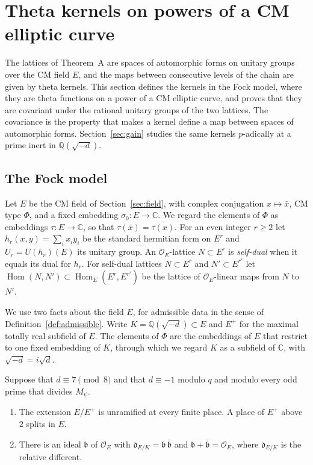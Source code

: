 \section{Theta kernels on powers of a CM elliptic curve}\label{sec:chain}

The lattices of Theorem~A are spaces of automorphic forms on unitary groups over the CM field $E$, and the maps between consecutive levels of the chain are given by theta kernels. This section defines the kernels in the Fock model, where they are theta functions on a power of a CM elliptic curve, and proves that they are covariant under the rational unitary groups of the two lattices. The covariance is the property that makes a kernel define a map between spaces of automorphic forms. Section~\ref{sec:gain} studies the same kernels $p$-adically at a prime inert in $\mathbb Q(\sqrt{-d})$.

\subsection{The Fock model}\label{sec:fock}

Let $E$ be the CM field of Section~\ref{sec:field}, with complex conjugation $x\mapsto\bar x$, CM type $\Phi$, and a fixed embedding $\sigma_0\colon E\to\mathbb C$. We regard the elements of $\Phi$ as embeddings $\tau\colon E\to\mathbb C$, so that $\tau(\bar x)=\overline{\tau(x)}$. For an even integer $r\ge2$ let $h_r(x,y)=\sum_ix_i\bar y_i$ be the standard hermitian form on $E^r$ and $U_r=U(h_r)(E)$ its unitary group. An $\mathcal O_E$-lattice $N\subset E^r$ is \emph{self-dual} when it equals its dual for $h_r$. For self-dual lattices $N\subset E^r$ and $N'\subset E^{r'}$ let $\operatorname{Hom}(N,N')\subset\operatorname{Hom}_E(E^r,E^{r'})$ be the lattice of $\mathcal O_E$-linear maps from $N$ to $N'$.

We use two facts about the field $E$, for admissible data in the sense of Definition~\ref{def:admissible}. Write $K=\mathbb Q(\sqrt{-d})\subset E$ and $E^+$ for the maximal totally real subfield of $E$. The elements of $\Phi$ are the embeddings of $E$ that restrict to one fixed embedding of $K$, through which we regard $K$ as a subfield of $\mathbb C$, with $\sqrt{-d}=i\sqrt d$.

\begin{lemma}\label{hostideal}
Suppose that $d\equiv7\pmod8$ and that $d\equiv-1$ modulo $q$ and modulo every odd prime that divides $M_\psi$.
\begin{enumerate}
\item[(i)] The extension $E/E^+$ is unramified at every finite place. A place of $E^+$ above $2$ splits in $E$.
\item[(ii)] There is an ideal $\mathfrak b$ of $\mathcal O_E$ with $\mathfrak d_{E/K}=\mathfrak b\,\bar{\mathfrak b}$ and $\mathfrak b+\bar{\mathfrak b}=\mathcal O_E$, where $\mathfrak d_{E/K}$ is the relative different.
\end{enumerate}
\end{lemma}

